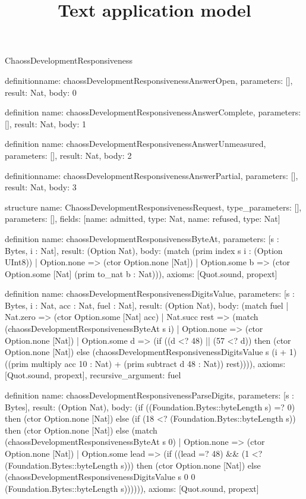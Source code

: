 \begin{lexlean}{ChaossDevelopmentResponsiveness}
\title{Text application model}
\begin{semanticmodule}
definition{name: chaossDevelopmentResponsivenessAnswerOpen, parameters: [], result: Nat, body: 0}

definition{
  name: chaossDevelopmentResponsivenessAnswerComplete,
  parameters: [],
  result: Nat,
  body: 1
}

definition{
  name: chaossDevelopmentResponsivenessAnswerUnmeasured,
  parameters: [],
  result: Nat,
  body: 2
}

definition{name: chaossDevelopmentResponsivenessAnswerPartial, parameters: [], result: Nat, body: 3}

structure{
  name: ChaossDevelopmentResponsivenessRequest,
  type_parameters: [],
  parameters: [],
  fields: [{name: admitted, type: Nat}, {name: refused, type: Nat}]
}

definition{
  name: chaossDevelopmentResponsivenessByteAt,
  parameters: [s : Bytes, i : Nat],
  result: (Option Nat),
  body: (match (prim index s i : (Option UInt8))
    | Option.none => (ctor Option.none [Nat])
    | Option.some b => (ctor Option.some [Nat] (prim to_nat b : Nat))),
  axioms: [Quot.sound, propext]
}

definition{
  name: chaossDevelopmentResponsivenessDigitsValue,
  parameters: [s : Bytes, i : Nat, acc : Nat, fuel : Nat],
  result: (Option Nat),
  body: (match fuel
    | Nat.zero => (ctor Option.some [Nat] acc)
    | Nat.succ rest => (match (chaossDevelopmentResponsivenessByteAt s i)
      | Option.none => (ctor Option.none [Nat])
      | Option.some d => (if ((d <? 48) || (57 <? d)) then (ctor Option.none [Nat]) else (chaossDevelopmentResponsivenessDigitsValue s (i + 1) ((prim multiply acc 10 : Nat) + (prim subtract d 48 : Nat)) rest)))),
  axioms: [Quot.sound, propext],
  recursive_argument: fuel
}

definition{
  name: chaossDevelopmentResponsivenessParseDigits,
  parameters: [s : Bytes],
  result: (Option Nat),
  body: (if ((Foundation.Bytes::byteLength s) =? 0) then (ctor Option.none [Nat]) else (if (18 <? (Foundation.Bytes::byteLength s)) then (ctor Option.none [Nat]) else (match (chaossDevelopmentResponsivenessByteAt s 0)
    | Option.none => (ctor Option.none [Nat])
    | Option.some lead => (if ((lead =? 48) && (1 <? (Foundation.Bytes::byteLength s))) then (ctor Option.none [Nat]) else (chaossDevelopmentResponsivenessDigitsValue s 0 0 (Foundation.Bytes::byteLength s)))))),
  axioms: [Quot.sound, propext]
}


\end{semanticmodule}
\end{lexlean}
